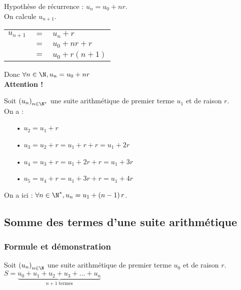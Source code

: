 Hypothèse de récurrence : $u_n = u_0 + nr$. \\

On calcule $u_{n+1}$. \\

\begin{tabular}{lll}
$u_{n+1}$ & $ = $ & $u_n + r$ \\
& $=$ & $u_0 + nr + r$ \\
& $=$ & $u_0 + r\left(n+1\right)$ \\ 
\end{tabular}

Donc $\forall n \in \N, u_n = u_0 + nr$ \\

\textbf{Attention !}

Soit $\left(u_n\right)_{n \in \N^*}$ une suite arithmétique de premier terme $u_1$ et de raison $r$. \\

On a :

\begin{itemize}
\item[•] $u_2 = u_1 + r$
\item[•] $u_3 = u_2 + r = u_1 + r + r = u_1 + 2r$
\item[•] $u_4 = u_3 + r = u_1 + 2r + r = u_1 + 3r$
\item[•] $u_5 = u_4 + r = u_1 + 3r + r = u_1 + 4r$
\end{itemize}

\vspace*{.3cm}

On a ici : $\forall n \in \N^*, u_n = u_1 + \left(n-1\right)r$. 

\newpage

\subsection{Somme des termes d'une suite arithmétique}

\subsubsection{Formule et démonstration}


Soit $\left(u_n\right)_{n \in \N}$ une suite arithmétique de premier terme $u_0$ et de raison $r$. \\

$ S = \underbrace{u_0 + u_1 + u_2 + u_3 + ... + u_n}_{n+1 \; \mathrm{termes}}$ \vspace*{.5cm} \\

